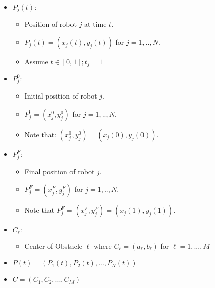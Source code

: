 \begin{itemize}
    \item \( P_j(t): \) 
    \begin{itemize}
        \item Position of robot \( j \) at time \( t \).
        \item \( P_j(t) = (x_j(t), y_j(t)) \) for \( j = 1,..,N \).
        \item Assume \( t \in [0,1]; t_f = 1 \) 
    \end{itemize}
    
    \item \( P_{j}^{0}: \) 
    \begin{itemize}
        \item Initial position of robot \( j \).
        \item \( P_{j}^{0} = (x_{j}^{0}, y_{j}^{0}) \) for \( j = 1,..,N \).
        \item Note that: \( (x_{j}^{0}, y_{j}^{0}) = (x_{j}(0), y_{j}(0)) \).
    \end{itemize}
    
    \item \(  P_{j}^{F}: \) 
    \begin{itemize}
        \item Final position of robot \( j \).
        \item \( P_{j}^{F} = (x_{j}^{F}, y_{j}^{F}) \) for \( j = 1,..,N \).
        \item Note that \( P_{j}^{F} = (x_{j}^{F}, y_{j}^{F}) = (x_{j}(1), y_{j}(1)). \) 
    \end{itemize}
    
    \item \( C_{\ell}: \) 
    \begin{itemize}
         \item Center of Obstacle \( \ell \) where \( C_{\ell} = (a_{\ell}, b_{\ell}) \) for \( \ell = 1,...,M \)
    \end{itemize}
    
    \item \( P(t) = (P_1(t),P_2(t),...,P_N(t)) \) 
    
    \item \( C = (C_1, C_2, ..., C_M) \)
    
\end{itemize}









